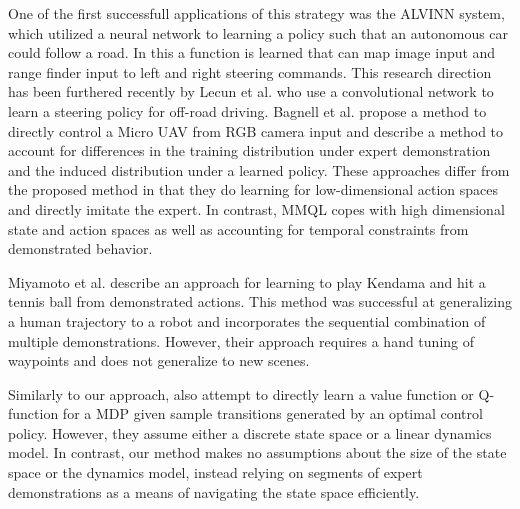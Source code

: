 One of the first successfull applications of this strategy was the ALVINN system, which utilized a neural network to learning a policy such that an autonomous car could follow a road.
In this a function is learned that can map image input and range finder input to left and right steering commands. 
This research direction has been furthered recently by Lecun et al.  who use a convolutional network to learn a steering policy for off-road driving.
Bagnell et al. propose a method to directly control a Micro UAV from RGB camera input and describe a method to account for differences in the training distribution under expert demonstration and the induced distribution under a learned policy. 
These approaches differ from the proposed method in that they do learning for low-dimensional action spaces and directly imitate the expert.
In contrast, MMQL copes with high dimensional state and action spaces as well as accounting for temporal constraints from demonstrated behavior.

Miyamoto et al.  describe an approach for learning to play Kendama and hit a tennis ball from demonstrated actions. 
This method was successful at generalizing a human trajectory to a robot and incorporates the sequential combination of multiple demonstrations.
However, their approach requires a hand tuning of waypoints and does not generalize to new scenes.

Similarly to our approach, \citet{Dvijotham_ICML2010} also attempt to directly
learn a value function or Q-function for a MDP given sample transitions
generated by an optimal control policy. However, they assume either a discrete
state space or a linear dynamics model. In contrast, our method makes no
assumptions about the size of the state space or the dynamics model, instead
relying on segments of expert demonstrations as a means of navigating the state
space efficiently. 
